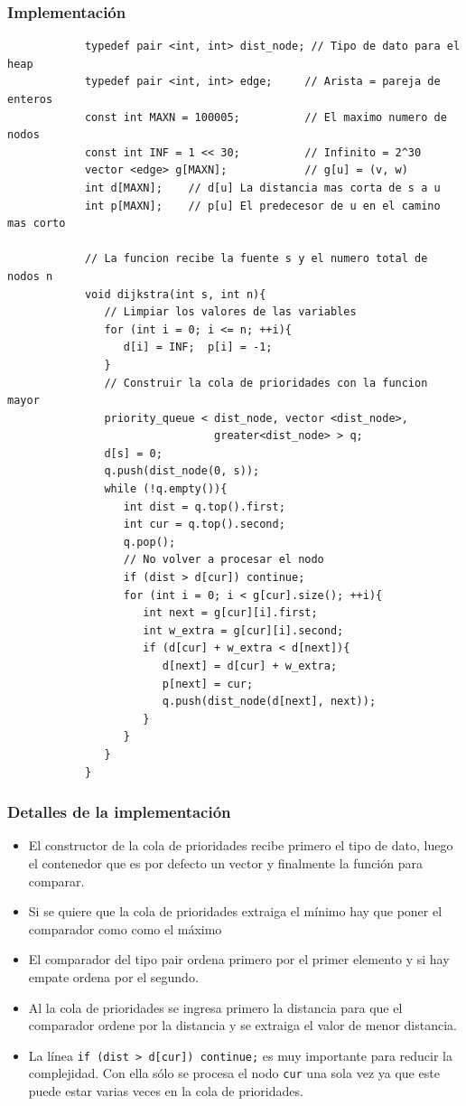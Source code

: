 \documentclass{beamer}
\begin{document}
	\begin{frame}
		\frametitle{Implementación}
		\begin{lstlisting}
			typedef pair <int, int> dist_node; // Tipo de dato para el heap
			typedef pair <int, int> edge;     // Arista = pareja de enteros
			const int MAXN = 100005;          // El maximo numero de nodos
			const int INF = 1 << 30;          // Infinito = 2^30
			vector <edge> g[MAXN];            // g[u] = (v, w)
			int d[MAXN];    // d[u] La distancia mas corta de s a u
			int p[MAXN];    // p[u] El predecesor de u en el camino mas corto

			// La funcion recibe la fuente s y el numero total de nodos n
			void dijkstra(int s, int n){
			   // Limpiar los valores de las variables
			   for (int i = 0; i <= n; ++i){
			      d[i] = INF;  p[i] = -1;
			   }
			   // Construir la cola de prioridades con la funcion mayor
			   priority_queue < dist_node, vector <dist_node>, 
			                    greater<dist_node> > q;
			   d[s] = 0;
			   q.push(dist_node(0, s));
			   while (!q.empty()){
			      int dist = q.top().first;
			      int cur = q.top().second;
			      q.pop();
			      // No volver a procesar el nodo
			      if (dist > d[cur]) continue;
			      for (int i = 0; i < g[cur].size(); ++i){
			         int next = g[cur][i].first;
			         int w_extra = g[cur][i].second;
			         if (d[cur] + w_extra < d[next]){
			            d[next] = d[cur] + w_extra;
			            p[next] = cur;
			            q.push(dist_node(d[next], next));
			         }
			      }
			   }  
			}
		\end{lstlisting}
	\end{frame}
	
	\begin{frame}[fragile]
		\frametitle{Detalles de la implementación}
		\begin{itemize}
			\item El constructor de la cola de prioridades recibe primero el tipo de dato, luego el contenedor que es por defecto un vector y finalmente la función para comparar.
			\item Si se quiere que la cola de prioridades extraiga el mínimo hay que poner el comparador como como el máximo
			\item El comparador del tipo pair ordena primero por el primer elemento y si hay empate ordena por el segundo.
			\item Al la cola de prioridades se ingresa primero la distancia para que el comparador ordene por la distancia y se extraiga el valor de menor distancia.
			\item La línea \verb|if (dist > d[cur]) continue;| es muy importante para reducir la complejidad. Con ella sólo se procesa el nodo \verb|cur| una sola vez ya que este puede estar varias veces en la cola de prioridades.
		\end{itemize}
	\end{frame}
	
\end{document}
